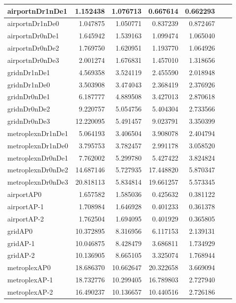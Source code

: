 \begin{longtable}{|l|r|r|r|r|r|r|}
\endlastfoot
airportnDr1nDe1 & 1.152438 & 1.076713 & 0.667614 & 0.662293 \\ \hline
airportnDr1nDe0 & 1.047875 & 1.050771 & 0.837239 & 0.872467 \\ \hline
airportnDr0nDe1 & 1.645942 & 1.539163 & 1.099474 & 1.065040 \\ \hline
airportnDr0nDe2 & 1.769750 & 1.620951 & 1.193770 & 1.064926 \\ \hline
airportnDr0nDe3 & 2.001274 & 1.676831 & 1.457010 & 1.318656 \\ \hline
gridnDr1nDe1 & 4.569358 & 3.524119 & 2.455590 & 2.018948 \\ \hline
gridnDr1nDe0 & 3.503908 & 3.474043 & 2.368419 & 2.376926 \\ \hline
gridnDr0nDe1 & 6.187777 & 4.889508 & 3.427013 & 2.870618 \\ \hline
gridnDr0nDe2 & 9.220757 & 5.054756 & 5.404304 & 2.733566 \\ \hline
gridnDr0nDe3 & 12.220095 & 5.491457 & 9.023791 & 3.350399 \\ \hline
metroplexnDr1nDe1 & 5.064193 & 3.406504 & 3.908078 & 2.404794 \\ \hline
metroplexnDr1nDe0 & 3.795753 & 3.782457 & 2.991178 & 3.058520 \\ \hline
metroplexnDr0nDe1 & 7.762002 & 5.299780 & 5.427422 & 3.824824 \\ \hline
metroplexnDr0nDe2 & 14.687146 & 5.727935 & 17.448820 & 5.870347 \\ \hline
metroplexnDr0nDe3 & 20.818113 & 5.834814 & 19.661257 & 5.573345 \\ \hline
airportAP0 & 1.657582 & 1.585036 & 0.425632 & 0.381122 \\ \hline
airportAP-1 & 1.708984 & 1.646928 & 0.401233 & 0.361378 \\ \hline
airportAP-2 & 1.762504 & 1.694095 & 0.401929 & 0.365805 \\ \hline
gridAP0 & 10.372895 & 8.316956 & 6.117153 & 2.139131 \\ \hline
gridAP-1 & 10.046875 & 8.428479 & 3.686811 & 1.734929 \\ \hline
gridAP-2 & 10.136905 & 8.665105 & 3.325074 & 1.768944 \\ \hline
metroplexAP0 & 18.686370 & 10.662647 & 20.322658 & 3.669094 \\ \hline
metroplexAP-1 & 18.732776 & 10.299405 & 16.789803 & 2.727940 \\ \hline
metroplexAP-2 & 16.490237 & 10.136657 & 10.440516 & 2.726186 \\ \hline

\end{longtable}
